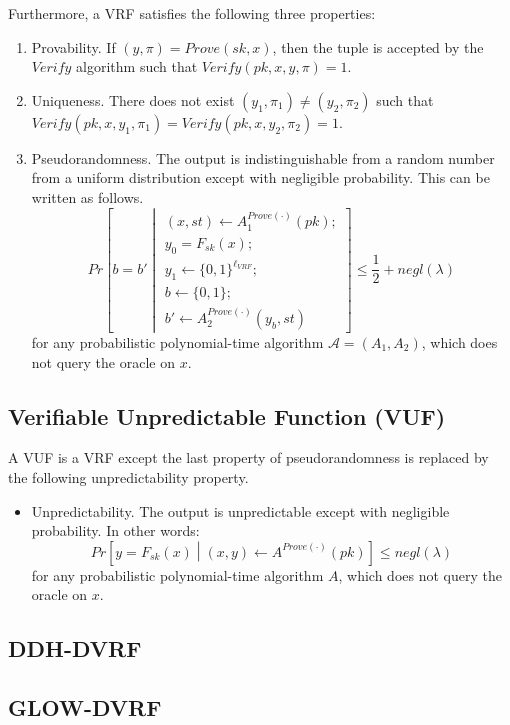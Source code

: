\documentclass[letterpaper,twocolumn,10pt]{article}
\theoremstyle{definition}
\theoremstyle{remark}
\begin{document}
Furthermore, a VRF satisfies the following three properties:
\begin{enumerate}
\item Provability. If $(y, \pi) = Prove(sk, x)$, then the tuple is accepted by the $Verify$ algorithm such that $Verify(pk, x, y, \pi) = 1$.
\item Uniqueness. There does not exist $(y_1, \pi_1) \neq (y_2, \pi_2)$ such that $Verify(pk, x, y_1, \pi_1) = Verify(pk, x, y_2, \pi_2) = 1$.
\item Pseudorandomness. The output is indistinguishable from a random number from a uniform distribution except with negligible probability. This can be written as follows.
\[
Pr\left[b = b' \middle\vert \begin{array}{l}
(x, st) \leftarrow A^{Prove(\cdot)}_{1}(pk);\\
y_0 = F_{sk}(x);\\
y_1 \leftarrow \{0, 1\}^{\ell_{VRF}};\\
b \leftarrow \{0, 1\};\\
b' \leftarrow A^{Prove(\cdot)}_{2}(y_b, st)
\end{array}\right] \leq \frac{1}{2} + negl(\lambda)
\]
for any probabilistic polynomial-time algorithm $\mathcal{A} = (A_1, A_2)$, which does not query the oracle on $x$.
\end{enumerate}

\subsection{Verifiable Unpredictable Function (VUF)}
A VUF \cite{micali1999verifiable,dodis2005verifiable} is a VRF except the last property of pseudorandomness is replaced by the following unpredictability property.
\begin{itemize}
\item Unpredictability. The output is unpredictable except with negligible probability. In other words:
\[
Pr\left[y = F_{sk}(x) \middle\vert (x, y) \leftarrow A^{Prove(\cdot)}(pk)\right] \leq negl(\lambda)
\]
for any probabilistic polynomial-time algorithm $A$, which does not query the oracle on $x$.
\end{itemize}

\subsection{DDH-DVRF}
\subsection{GLOW-DVRF}
\end{document}
